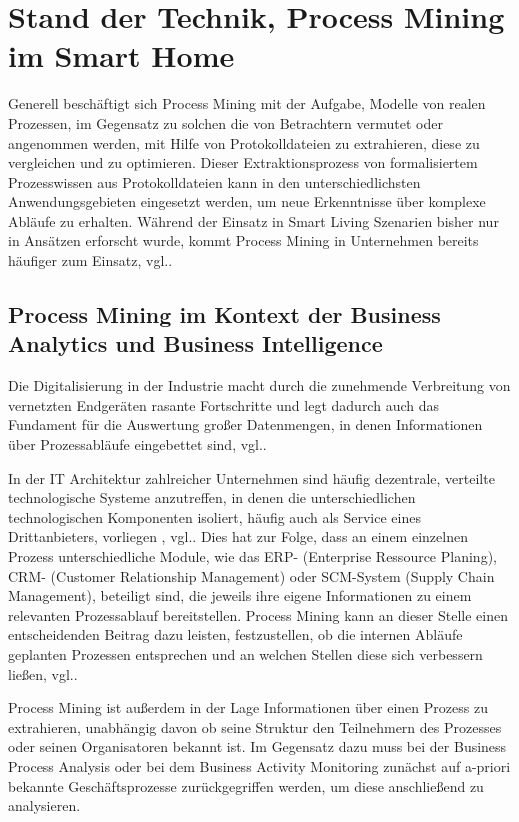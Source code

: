\chapter{Stand der Technik, Process Mining im Smart Home}\label{chap:stateoftheart}
Generell beschäftigt sich Process Mining mit der Aufgabe, Modelle von realen Prozessen, im Gegensatz zu solchen die von Betrachtern vermutet oder angenommen werden, mit Hilfe von Protokolldateien zu extrahieren, diese zu vergleichen und zu optimieren.\cite{PMinAction}
Dieser Extraktionsprozess von formalisiertem Prozesswissen aus Protokolldateien kann in den  unterschiedlichsten Anwendungsgebieten eingesetzt werden, um neue Erkenntnisse über komplexe Abläufe zu erhalten. Während der Einsatz in Smart Living Szenarien bisher nur in Ansätzen erforscht wurde, kommt Process Mining in Unternehmen bereits häufiger zum Einsatz, vgl.\cite{litreview}.

\section{Process Mining im Kontext der Business Analytics und Business Intelligence}

Die Digitalisierung in der Industrie macht durch die zunehmende Verbreitung von vernetzten Endgeräten rasante Fortschritte und legt dadurch auch das Fundament für die Auswertung großer Datenmengen, in denen Informationen über Prozessabläufe eingebettet sind, vgl.\cite{GanscharGerlac}. 

In der IT Architektur zahlreicher Unternehmen sind häufig dezentrale, verteilte technologische Systeme anzutreffen, in denen die unterschiedlichen technologischen Komponenten isoliert, häufig auch als Service eines Drittanbieters, vorliegen , vgl.\cite{GanscharGerlac}. Dies hat zur Folge, dass an einem einzelnen Prozess unterschiedliche Module, wie das ERP- (Enterprise Ressource Planing), CRM- (Customer Relationship Management) oder SCM-System (Supply Chain Management), beteiligt sind, die jeweils ihre eigene Informationen zu einem relevanten Prozessablauf bereitstellen. Process Mining kann an dieser Stelle einen entscheidenden Beitrag dazu leisten, festzustellen, ob die internen Abläufe geplanten Prozessen entsprechen und an welchen Stellen diese sich verbessern ließen, vgl.\cite{PMinAction}.

Process Mining ist außerdem in der Lage Informationen über einen Prozess zu extrahieren, unabhängig davon ob seine Struktur den Teilnehmern des Prozesses oder seinen Organisatoren bekannt ist. Im Gegensatz dazu muss bei der Business Process Analysis oder bei dem Business Activity Monitoring zunächst auf a-priori bekannte Geschäftsprozesse zurückgegriffen werden, um diese anschließend zu analysieren. 

